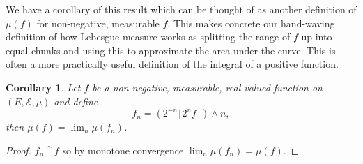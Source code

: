 \documentclass[11pt]{article}
\newtheorem{cor}[thm]{Corollary}
\theoremstyle{definition}
\theoremstyle{remark}
\begin{document}
We have a corollary of this result which can be thought of as another definition of $\mu(f)$ for non-negative, measurable $f$. This makes concrete our hand-waving definition of how Lebesgue measure works as splitting the range of $f$ up into equal chunks and using this to approximate the area under the curve. This is often a more practically useful definition of the integral of a positive function. 
\begin{cor}
Let $f$ be a non-negative, measurable, real valued function on $(E, \mathcal{E}, \mu)$ and define
\[ f_n = \left( 2^{-n} \lfloor 2^n f \rfloor \right) \wedge n, \] then $\mu(f) = \lim_n \mu(f_n)$.
\end{cor}
\begin{proof}
$f_n \uparrow f$ so by monotone convergence $\lim_n \mu(f_n) = \mu(f)$. 
\end{proof}
\end{document}
